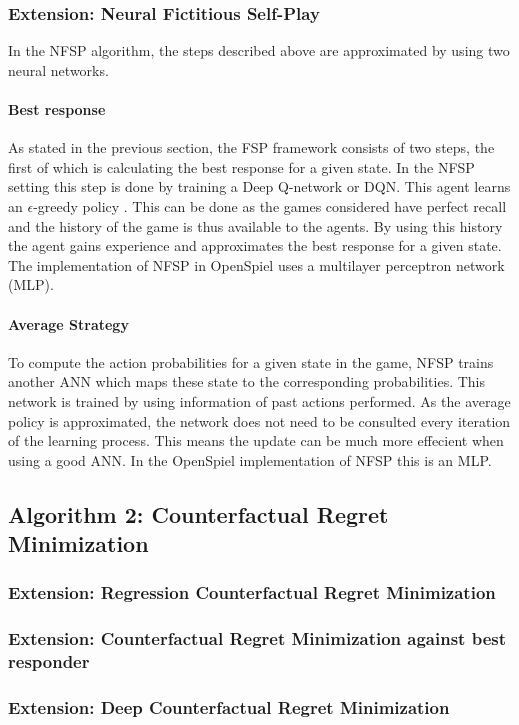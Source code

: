 \documentclass[10pt,a4paper]{article}
\begin{document}
\subsubsection{Extension: Neural Fictitious Self-Play}
In the NFSP algorithm, the steps described above are approximated by using two neural networks.
\paragraph{Best response}
As stated in the previous section, the FSP framework consists of two steps, the first of which is calculating the best response for a given state. In the NFSP setting this step is done by training a Deep Q-network or DQN. This agent learns an $\epsilon$-greedy policy \cite{heinrichphd}. This can be done as the games considered have perfect recall and the history of the game is thus available to the agents. By using this history the agent gains experience and approximates the best response for a given state.
The implementation of NFSP in OpenSpiel uses a multilayer perceptron network (MLP).
\paragraph{Average Strategy}
To compute the action probabilities for a given state in the game, NFSP trains another ANN which maps these state to the corresponding probabilities. This network is trained by using information of past actions performed. As the average policy is approximated, the network does not need to be consulted every iteration of the learning process. This means the update can be much more effecient when using a good ANN.
In the OpenSpiel implementation of NFSP this is an MLP.


\subsection{Algorithm 2: Counterfactual Regret Minimization}
\subsubsection{Extension: Regression Counterfactual Regret Minimization}
\subsubsection{Extension: Counterfactual Regret Minimization against best responder}
\subsubsection{Extension: Deep Counterfactual Regret Minimization}
\end{document}
